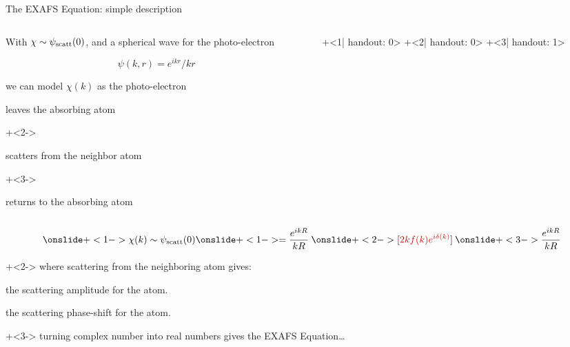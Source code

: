 \begin{slide}{The EXAFS Equation: simple description}

  \begin{columns}[T]

    \begin{column}{60mm}
      With ${ \chi \sim \psi_{\rm scatt}(0)}$, and a spherical wave for the
      photo-electron

      \[ \psi(k,r) = {{e^{ikr}}/{kr}} \]

      we can model $\chi(k)$ as the photo-electron
        \begin{enumerate}
          \item leaves the absorbing atom
          {\onslide+<2->{ \item scatters from the neighbor atom}}
          {\onslide+<3->{ \item returns to the absorbing atom}}
        \end{enumerate}
      \end{column}
      \begin{column}{50mm}
        \begin{overprint}[48mm]
          \onslide+<1| handout: 0> 
          \onslide+<2| handout: 0> 
          \onslide+<3| handout: 1> 
        \end{overprint}

      \end{column}
    \end{columns}

     {\large
       \[ {\displaystyle
         {\onslide+<1-> \chi(k) \sim \psi_{\rm scatt}(0)}
         {\onslide+<1-> = {{e^{ikR}}\over{kR}} \> }
         {\onslide+<2-> [{\Red{2k f(k)e^{i\delta(k)}}} ] \> }
         {\onslide+<3-> {{e^{ikR}}\over{kR}}}
      }
       \]
     }

     {    \onslide+<2->
       where scattering from the neighboring atom gives:

        \begin{description} \settowidth{\labelwidth}{5mm} \setlength{\itemindent}{-5mm}

        \item[\Red{ $f(k)$ \hspace{1mm}}] the scattering amplitude for the atom.
        \item[\Red{ $\delta(k)$ \hspace{1mm}}] the scattering phase-shift for the atom.
       \end{description}
     }

     {\onslide+<3-> \hspace{5mm} turning complex number into real numbers gives the EXAFS Equation\ldots }

\end{slide}
